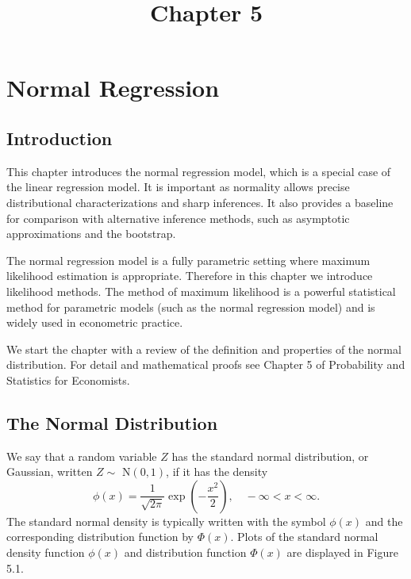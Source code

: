 \documentclass[10pt]{article}
\title{Chapter 5 }
\author{}
\date{}
\begin{document}
\maketitle
\section{Normal Regression}
\subsection{Introduction}
This chapter introduces the normal regression model, which is a special case of the linear regression model. It is important as normality allows precise distributional characterizations and sharp inferences. It also provides a baseline for comparison with alternative inference methods, such as asymptotic approximations and the bootstrap.

The normal regression model is a fully parametric setting where maximum likelihood estimation is appropriate. Therefore in this chapter we introduce likelihood methods. The method of maximum likelihood is a powerful statistical method for parametric models (such as the normal regression model) and is widely used in econometric practice.

We start the chapter with a review of the definition and properties of the normal distribution. For detail and mathematical proofs see Chapter 5 of Probability and Statistics for Economists.

\subsection{The Normal Distribution}
We say that a random variable $Z$ has the standard normal distribution, or Gaussian, written $Z \sim$ $\mathrm{N}(0,1)$, if it has the density
$$
\phi(x)=\frac{1}{\sqrt{2 \pi}} \exp \left(-\frac{x^{2}}{2}\right), \quad-\infty<x<\infty .
$$
The standard normal density is typically written with the symbol $\phi(x)$ and the corresponding distribution function by $\Phi(x)$. Plots of the standard normal density function $\phi(x)$ and distribution function $\Phi(x)$ are displayed in Figure 5.1.
\end{document}
